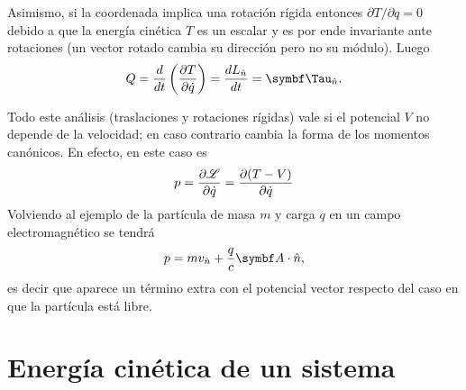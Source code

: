 \documentclass[10pt,oneside]{CBFT_book}
\begin{document}
Asimismo, si la coordenada implica una rotación rígida entonces $ \partial{T}/\partial{q} = 0 $ 
debido a que la energía cinética $ T $ es un escalar y es por ende invariante ante rotaciones
(un vector rotado cambia su dirección pero no su módulo).
Luego
\[
	Q = \frac{d}{dt}\left( \dpar{T}{\dot{q}} \right) = \dtot{L_{\hat{n}}}{t} = \vb{\Tau}_{\hat{n}}.
\]

Todo este análisis (traslaciones y rotaciones rígidas) vale si el potencial $V$ no depende de la
velocidad; en caso contrario cambia la forma de los momentos canónicos. En efecto, en este caso
es
\[
	p = \frac{\partial^{\hspace{-0.05em}} { \mathscr{L} }}{\partial {\dot{q}}^{\hspace{-0.05em}}} = \frac{\partial^{\hspace{-0.05em}} {(T-V)}}{\partial {\dot{q}}^{\hspace{-0.05em}}}
\]
Volviendo al ejemplo de la partícula de masa $m$ y carga $q$ en un campo electromagnético se tendrá
\[
	p = m v_{\hat{n}} + \frac{q}{c} \vb{A}\cdot\hat{n},
\]
es decir que aparece un término extra con el potencial vector respecto del caso en que la partícula
está libre.

\section{Energía cinética de un sistema}
\end{document}
